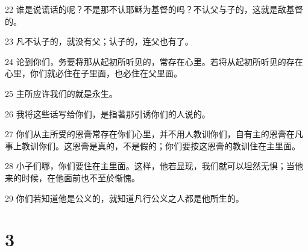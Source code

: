 \par 22 谁是说谎话的呢？不是那不认耶稣为基督的吗？不认父与子的，这就是敌基督的。
\par 23 凡不认子的，就没有父；认子的，连父也有了。
\par 24 论到你们，务要将那从起初所听见的，常存在心里。若将从起初所听见的存在心里，你们就必住在子里面，也必住在父里面。
\par 25 主所应许我们的就是永生。
\par 26 我将这些话写给你们，是指著那引诱你们的人说的。
\par 27 你们从主所受的恩膏常存在你们心里，并不用人教训你们，自有主的恩膏在凡事上教训你们。这恩膏是真的，不是假的；你们要按这恩膏的教训住在主里面。
\par 28 小子们哪，你们要住在主里面。这样，他若显现，我们就可以坦然无惧；当他来的时候，在他面前也不至於惭愧。
\par 29 你们若知道他是公义的，就知道凡行公义之人都是他所生的。

\chapter{3}

